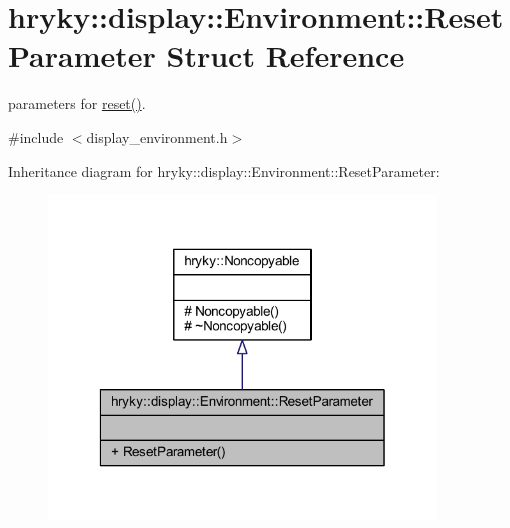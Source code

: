 \hypertarget{structhryky_1_1display_1_1_environment_1_1_reset_parameter}{\section{hryky\-:\-:display\-:\-:Environment\-:\-:Reset\-Parameter Struct Reference}
\label{structhryky_1_1display_1_1_environment_1_1_reset_parameter}
}


parameters for \hyperlink{classhryky_1_1display_1_1_environment_ae9bf389c9271424c89a536ce16945b8f}{reset()}.  




{\ttfamily \#include $<$display\-\_\-environment.\-h$>$}



Inheritance diagram for hryky\-:\-:display\-:\-:Environment\-:\-:Reset\-Parameter\-:
\nopagebreak
\begin{figure}[H]
\begin{center}
\leavevmode
\includegraphics[width=292pt]{structhryky_1_1display_1_1_environment_1_1_reset_parameter__inherit__graph}
\end{center}
\end{figure}
